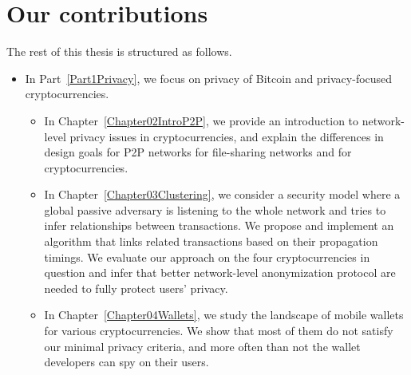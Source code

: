 \section{Our contributions}

The rest of this thesis is structured as follows.

\begin{itemize}
	\item 
	In Part~\ref{Part1Privacy}, we focus on privacy of Bitcoin and privacy-focused cryptocurrencies.
	\begin{itemize}
		\item
	In Chapter~\ref{Chapter02IntroP2P}, we provide an introduction to network-level privacy issues in cryptocurrencies, and explain the differences in design goals for P2P networks for file-sharing networks and for cryptocurrencies.
		\item
	In Chapter~\ref{Chapter03Clustering}, we consider a security model where a global passive adversary is listening to the whole network and tries to infer relationships between transactions.
	We propose and implement an algorithm that links related transactions based on their propagation timings.
	We evaluate our approach on the four cryptocurrencies in question and infer that better network-level anonymization protocol are needed to fully protect users' privacy.
		\item
	In Chapter~\ref{Chapter04Wallets}, we study the landscape of mobile wallets for various cryptocurrencies.
	We show that most of them do not satisfy our minimal privacy criteria, and more often than not the wallet developers can spy on their users.
	\end{itemize}


\end{itemize}
